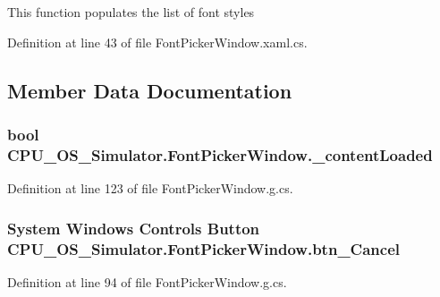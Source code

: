 This function populates the list of font styles 



Definition at line 43 of file Font\+Picker\+Window.\+xaml.\+cs.



\subsection{Member Data Documentation}
\hypertarget{class_c_p_u___o_s___simulator_1_1_font_picker_window_aa37d57c41c80a6fa875193d68754f658}{}
\subsubsection[{\+\_\+content\+Loaded}]{\setlength{\rightskip}{0pt plus 5cm}bool C\+P\+U\+\_\+\+O\+S\+\_\+\+Simulator.\+Font\+Picker\+Window.\+\_\+content\+Loaded\hspace{0.3cm}{\ttfamily [private]}}\label{class_c_p_u___o_s___simulator_1_1_font_picker_window_aa37d57c41c80a6fa875193d68754f658}


Definition at line 123 of file Font\+Picker\+Window.\+g.\+cs.

\hypertarget{class_c_p_u___o_s___simulator_1_1_font_picker_window_ad6c32f2add6a3395a8e798bdcdfbaa2c}{}
\subsubsection[{btn\+\_\+\+Cancel}]{\setlength{\rightskip}{0pt plus 5cm}System Windows Controls Button C\+P\+U\+\_\+\+O\+S\+\_\+\+Simulator.\+Font\+Picker\+Window.\+btn\+\_\+\+Cancel\hspace{0.3cm}{\ttfamily [package]}}\label{class_c_p_u___o_s___simulator_1_1_font_picker_window_ad6c32f2add6a3395a8e798bdcdfbaa2c}


Definition at line 94 of file Font\+Picker\+Window.\+g.\+cs.


